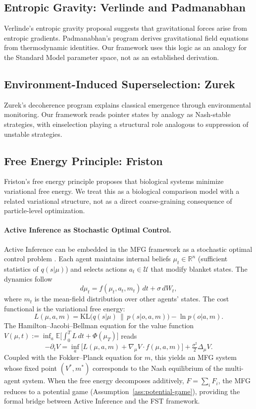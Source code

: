 \documentclass[12pt,a4paper]{article}
\theoremstyle{remark}
\begin{document}
\subsection{Entropic Gravity: Verlinde and Padmanabhan}

Verlinde's entropic gravity proposal \citep{Verlinde2011} suggests that gravitational forces arise from entropic gradients. Padmanabhan's program \citep{Padmanabhan2010} derives gravitational field equations from thermodynamic identities. Our framework uses this logic as an analogy for the Standard Model parameter space, not as an established derivation.

\subsection{Environment-Induced Superselection: Zurek}

Zurek's decoherence program \citep{Zurek2003} explains classical emergence through environmental monitoring. Our framework reads pointer states by analogy as Nash-stable strategies, with einselection playing a structural role analogous to suppression of unstable strategies.

\subsection{Free Energy Principle: Friston}

Friston's free energy principle \citep{Friston2010} proposes that biological systems minimize variational free energy. We treat this as a biological comparison model with a related variational structure, not as a direct coarse-graining consequence of particle-level optimization.

\paragraph{Active Inference as Stochastic Optimal Control.}
Active Inference can be embedded in the MFG framework as a stochastic optimal control problem \citep{LasryLions2006,LasryLions2007}. Each agent maintains internal beliefs $\mu_t \in \mathbb{R}^n$ (sufficient statistics of $q(s|\mu)$) and selects actions $a_t \in \mathcal{U}$ that modify blanket states. The dynamics follow
\[
  d\mu_t = f(\mu_t, a_t, m_t)\,dt + \sigma\,dW_t,
\]
where $m_t$ is the mean-field distribution over other agents' states. The cost functional is the variational free energy:
\[
  L(\mu, a, m) = \mathrm{KL}\bigl(q(s|\mu) \,\|\, p(s|o,a,m)\bigr) - \ln p(o|a,m).
\]
The Hamilton--Jacobi--Bellman equation for the value function $V(\mu,t) := \inf_{a} \mathbb{E}\bigl[\int_0^T L\,dt + \Phi(\mu_T)\bigr]$ reads
\[
  -\partial_t V = \inf_a\bigl[L(\mu,a,m) + \nabla_\mu V \cdot f(\mu,a,m)\bigr] + \tfrac{\sigma^2}{2}\Delta_\mu V.
\]
Coupled with the Fokker--Planck equation for $m$, this yields an MFG system whose fixed point $(V^*, m^*)$ corresponds to the Nash equilibrium of the multi-agent system. When the free energy decomposes additively, $F = \sum_i F_i$, the MFG reduces to a potential game (Assumption~\ref{ass:potential-game}), providing the formal bridge between Active Inference and the FST framework.
\end{document}
